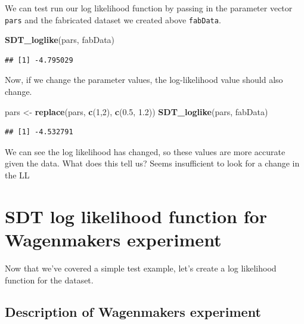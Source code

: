 \documentclass[]{book}
\newenvironment{Shaded}{\begin{snugshade}}{\end{snugshade}}
\newcommand{\DecValTok}[1]{\textcolor[rgb]{0.00,0.00,0.81}{#1}}
\newcommand{\FloatTok}[1]{\textcolor[rgb]{0.00,0.00,0.81}{#1}}
\newcommand{\KeywordTok}[1]{\textcolor[rgb]{0.13,0.29,0.53}{\textbf{#1}}}
\newcommand{\NormalTok}[1]{#1}
\newcommand{\StringTok}[1]{\textcolor[rgb]{0.31,0.60,0.02}{#1}}
\begin{document}
We can test run our log likelihood function by passing in the parameter vector \texttt{pars} and the fabricated dataset we created above \texttt{fabData}.

\begin{Shaded}
\begin{Highlighting}[]
\KeywordTok{SDT_loglike}\NormalTok{(pars, fabData)}
\end{Highlighting}
\end{Shaded}

\begin{verbatim}
## [1] -4.795029
\end{verbatim}

Now, if we change the parameter values, the log-likelihood value should also change.

\begin{Shaded}
\begin{Highlighting}[]
\NormalTok{pars <-}\StringTok{ }\KeywordTok{replace}\NormalTok{(pars, }\KeywordTok{c}\NormalTok{(}\DecValTok{1}\NormalTok{,}\DecValTok{2}\NormalTok{), }\KeywordTok{c}\NormalTok{(}\FloatTok{0.5}\NormalTok{, }\FloatTok{1.2}\NormalTok{))}
\KeywordTok{SDT_loglike}\NormalTok{(pars, fabData)}
\end{Highlighting}
\end{Shaded}

\begin{verbatim}
## [1] -4.532791
\end{verbatim}

We can see the log likelihood has changed, so these values are more accurate given the data.
 What does this tell us? Seems insufficient to look for a change in the LL

\hypertarget{sdt-log-likelihood-function-for-wagenmakers-experiment}{%
\section{SDT log likelihood function for Wagenmakers experiment}\label{sdt-log-likelihood-function-for-wagenmakers-experiment}}

Now that we've covered a simple test example, let's create a log likelihood function for the \citet{wagenmakers2008diffusion} dataset.

\hypertarget{description-of-wagenmakers-experiment}{%
\subsection{Description of Wagenmakers experiment}\label{description-of-wagenmakers-experiment}}
\end{document}
